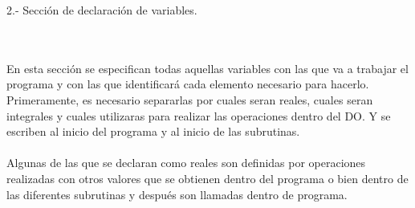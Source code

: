 \documentclass[12pt]{article}
\begin{document}
\begin{large}
2.- Sección de declaración de variables.
\end{large}\\
\\
En esta sección se especifican todas aquellas variables con las que va a trabajar el programa y con las que identificará cada elemento necesario para hacerlo. Primeramente, es necesario separarlas por cuales seran reales, cuales seran integrales y cuales utilizaras para realizar las operaciones dentro del DO. Y se escriben al inicio del programa y al inicio de las subrutinas.\\
\\
Algunas de las que se declaran como reales son definidas por operaciones realizadas con otros valores que se obtienen dentro del programa o bien dentro de las diferentes subrutinas y después son llamadas dentro de programa.
\end{document}
